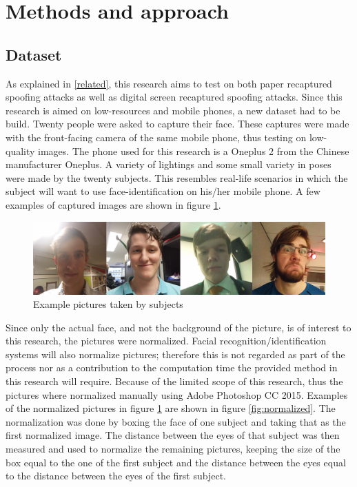 \documentclass{sig-alternate-br}
\begin{document}
\section{Methods and approach} \label{methods}

\subsection{Dataset} \label{dataset}
As explained in \ref{related}, this research aims to test on both paper recaptured spoofing attacks as well as digital screen recaptured spoofing attacks. Since this research is aimed on low-resources and mobile phones, a new dataset had to be build. Twenty people were asked to capture their face. These captures were made with the front-facing camera of the same mobile phone, thus testing on low-quality images. The phone used for this research is a Oneplus 2 from the Chinese manufacturer Oneplus. A variety of lightings and some small variety in poses were made by the twenty subjects. This resembles real-life scenarios in which the subject will want to use face-identification on his/her mobile phone. A few examples of captured images are shown in figure \ref{fig:pictures}.

\begin{figure}[h]
	\includegraphics[scale=0.2]{pictures}
	\caption{Example pictures taken by subjects}
	\label{fig:pictures}
\end{figure}

Since only the actual face, and not the background of the picture, is of interest to this research, the pictures were normalized. Facial recognition/identification systems will also normalize pictures; therefore this is not regarded as part of the process nor as a contribution to the computation time the provided method in this research will require. Because of the limited scope of this research, thus the pictures where normalized manually using Adobe Photoshop CC 2015. Examples of the normalized pictures in figure \ref{fig:pictures} are shown in figure \ref{fig:normalized}. The normalization was done by boxing the face of one subject and taking that as the first normalized image. The distance between the eyes of that subject was then measured and used to normalize the remaining pictures, keeping the size of the box equal to the one of the first subject and the distance between the eyes equal to the distance between the eyes of the first subject.
\end{document}
